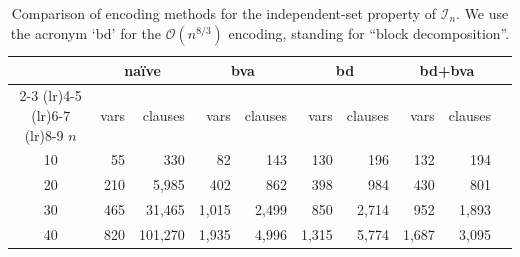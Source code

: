 \documentclass[11pt]{article}
\renewcommand{\O}{\mathcal{O}}
\begin{document}
\begin{table}[htbp]
  \centering
  \caption{Comparison of encoding methods for the independent-set property of $\mathcal{I}_n$. We use the acronym `bd' for the $\O(n^{8/3})$ encoding, standing for ``block decomposition''.}
  \label{tab:encoding-comparison2}
  \begin{tabular}{crrrrrrrrr}
    \toprule
    & \multicolumn{2}{c}{naïve} & \multicolumn{2}{c}{bva} & \multicolumn{2}{c}{bd} & \multicolumn{2}{c}{bd+bva} \\
    \cmidrule(lr){2-3} \cmidrule(lr){4-5} \cmidrule(lr){6-7} \cmidrule(lr){8-9}
    $n$ & vars & clauses & vars & clauses & vars & clauses & vars & clauses \\
    \midrule
    10 & 55 & 330 & 82 & 143 & 130 & 196 & 132 & 194 \\
    20 & 210 & 5,985 & 402 & 862 & 398 & 984 & 430 & 801 \\
    30 & 465 & 31,465 & 1,015 & 2,499 & 850 & 2,714 & 952 & 1,893 \\
    40 & 820 & 101,270 & 1,935 & 4,996 & 1,315 & 5,774 & 1,687 & 3,095 \\
    \bottomrule
  \end{tabular}
\end{table}
\end{document}

